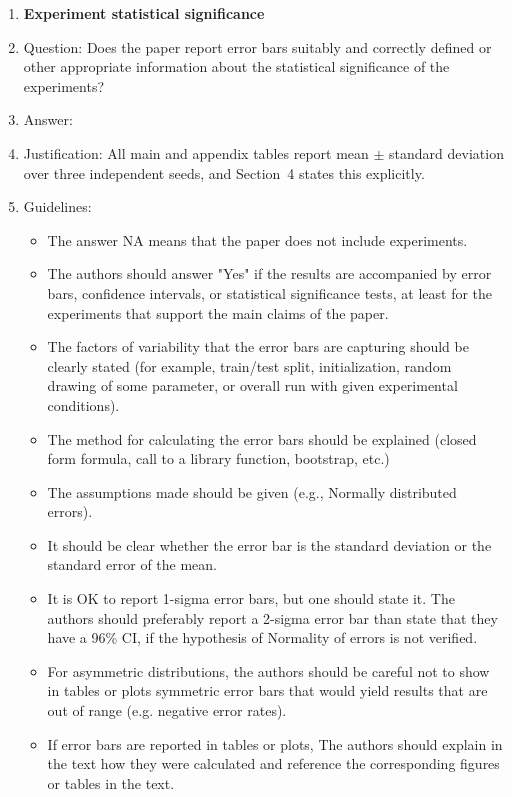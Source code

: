 \documentclass{article}
\begin{document}
\begin{enumerate}
\item {\bf Experiment statistical significance}
    \item[] Question: Does the paper report error bars suitably and correctly defined or other appropriate information about the statistical significance of the experiments?
    \item[] Answer: \answerYes{}
    \item[] Justification: All main and appendix tables report mean $\pm$ standard deviation over three independent seeds, and Section~4 states this explicitly.
    \item[] Guidelines:
    \begin{itemize}
        \item The answer NA means that the paper does not include experiments.
        \item The authors should answer "Yes" if the results are accompanied by error bars, confidence intervals, or statistical significance tests, at least for the experiments that support the main claims of the paper.
        \item The factors of variability that the error bars are capturing should be clearly stated (for example, train/test split, initialization, random drawing of some parameter, or overall run with given experimental conditions).
        \item The method for calculating the error bars should be explained (closed form formula, call to a library function, bootstrap, etc.)
        \item The assumptions made should be given (e.g., Normally distributed errors).
        \item It should be clear whether the error bar is the standard deviation or the standard error of the mean.
        \item It is OK to report 1-sigma error bars, but one should state it. The authors should preferably report a 2-sigma error bar than state that they have a 96\% CI, if the hypothesis of Normality of errors is not verified.
        \item For asymmetric distributions, the authors should be careful not to show in tables or plots symmetric error bars that would yield results that are out of range (e.g. negative error rates).
        \item If error bars are reported in tables or plots, The authors should explain in the text how they were calculated and reference the corresponding figures or tables in the text.
    \end{itemize}


\end{enumerate}
\end{document}
